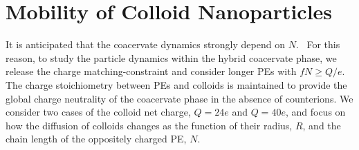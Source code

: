 \documentclass[journal=mamobx, manuscript=article]{achemso}
\begin{document}
\newpage
\section{Mobility of Colloid Nanoparticles}
\label{section:dynamics}

It is anticipated that the coacervate dynamics strongly depend on $N$.~\cite{artem2022hybrid} For this reason, to study the particle dynamics within the hybrid coacervate phase, we release the charge matching-constraint and consider longer PEs with $fN \geq Q/e$. The charge stoichiometry between PEs and colloids is maintained to provide the global charge neutrality of the coacervate phase in the absence of counterions. We consider two cases of the colloid net charge, $Q = 24e$ and $Q = 40e$, and focus on how the diffusion of colloids changes as the function of their radius, $R$, and the chain length of the oppositely charged PE, $N$.
\end{document}
